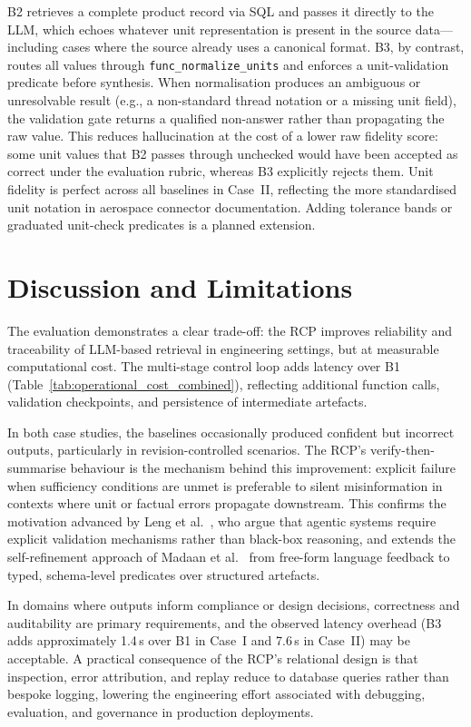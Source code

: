 \documentclass[largeformat]{interact}
\begin{document}
B2 retrieves a complete product record via SQL and passes it directly to the LLM, which echoes whatever unit representation is present in the source data---including cases where the source already uses a canonical format. B3, by contrast, routes all values through \texttt{func\_normalize\_units} and enforces a unit-validation predicate before synthesis. When normalisation produces an ambiguous or unresolvable result (e.g., a non-standard thread notation or a missing unit field), the validation gate returns a qualified non-answer rather than propagating the raw value. This reduces hallucination at the cost of a lower raw fidelity score: some unit values that B2 passes through unchecked would have been accepted as correct under the evaluation rubric, whereas B3 explicitly rejects them. Unit fidelity is perfect across all baselines in Case~II, reflecting the more standardised unit notation in aerospace connector documentation. Adding tolerance bands or graduated unit-check predicates is a planned extension.

\section{Discussion and Limitations}
\label{sec:Discussion}
The evaluation demonstrates a clear trade-off: the RCP improves reliability and traceability of LLM-based retrieval in engineering settings, but at measurable computational cost. The multi-stage control loop adds latency over B1 (Table~\ref{tab:operational_cost_combined}), reflecting additional function calls, validation checkpoints, and persistence of intermediate artefacts.


In both case studies, the baselines occasionally produced confident but incorrect outputs, particularly in revision-controlled scenarios. The RCP's verify-then-summarise behaviour is the mechanism behind this improvement: explicit failure when sufficiency conditions are unmet is preferable to silent misinformation in contexts where unit or factual errors propagate downstream. This confirms the motivation advanced by Leng et al.~\cite{leng2026}, who argue that agentic systems require explicit validation mechanisms rather than black-box reasoning, and extends the self-refinement approach of Madaan et al.~\cite{madaan2023selfrefine} from free-form language feedback to typed, schema-level predicates over structured artefacts.

In domains where outputs inform compliance or design decisions, correctness and auditability are primary requirements, and the observed latency overhead (B3 adds approximately 1.4\,s over B1 in Case~I and 7.6\,s in Case~II) may be acceptable. A practical consequence of the RCP's relational design is that inspection, error attribution, and replay reduce to database queries rather than bespoke logging, lowering the engineering effort associated with debugging, evaluation, and governance in production deployments.
\end{document}
